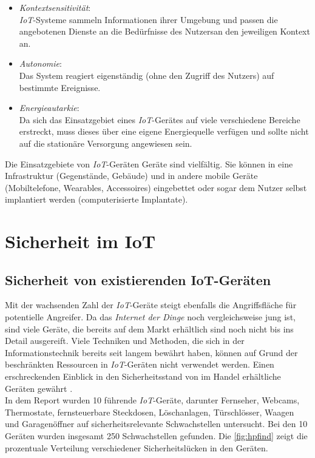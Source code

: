 \documentclass[conference]{IEEEtran}
\begin{document}
\begin{itemize}
  \item \textit{Kontextsensitivität}: \\
  \textit{IoT}-Systeme sammeln Informationen ihrer Umgebung und passen die angebotenen Dienste an die Bedürfnisse des Nutzersan den jeweiligen Kontext an.  \newline
  \item \textit{Autonomie}: \\ 
  Das System reagiert eigenständig (ohne den Zugriff des Nutzers) auf bestimmte Ereignisse. \newline
  \item \textit{Energieautarkie}:\\ 
 Da sich das Einsatzgebiet eines \textit{IoT}-Gerätes auf viele verschiedene Bereiche erstreckt, muss dieses über eine eigene Energiequelle verfügen und sollte nicht auf die stationäre Versorgung angewiesen sein.  
\end{itemize}
Die Einsatzgebiete von \textit{IoT}-Geräten Geräte sind vielfältig. Sie können in eine Infrastruktur (Gegenstände, Gebäude) und in andere mobile Geräte (Mobiltelefone, Wearables, Accessoires) eingebettet oder sogar dem Nutzer selbst implantiert werden (computerisierte Implantate)\cite{fried}. \\

\section{Sicherheit im IoT}
\subsection{Sicherheit von existierenden IoT-Geräten}
Mit der wachsenden Zahl der \textit{IoT}-Geräte steigt ebenfalls die Angriffsfläche für potentielle Angreifer. Da das \textit{Internet der Dinge} noch vergleichsweise jung ist, sind viele Geräte, die bereits auf dem Markt erhältlich sind noch nicht bis ins Detail ausgereift. Viele Techniken und Methoden, die sich in der Informationstechnik bereits seit langem bewährt haben, können auf Grund der beschränkten Ressourcen in \textit{IoT}-Geräten nicht verwendet werden. Einen erschreckenden Einblick in den Sicherheitsstand von im Handel erhältliche Geräten gewährt \cite{hpack}. \\
In dem Report wurden 10 führende \textit{IoT}-Geräte, darunter Fernseher, Webcams, Thermostate, fernsteuerbare Steckdosen, Löschanlagen, Türschlösser, Waagen und Garagenöffner auf sicherheitsrelevante Schwachstellen untersucht. Bei den 10 Geräten wurden insgesamt 250 Schwachstellen gefunden. Die \autoref{fig:hpfind} zeigt die prozentuale Verteilung verschiedener Sicherheitslücken in den Geräten.   
\end{document}
